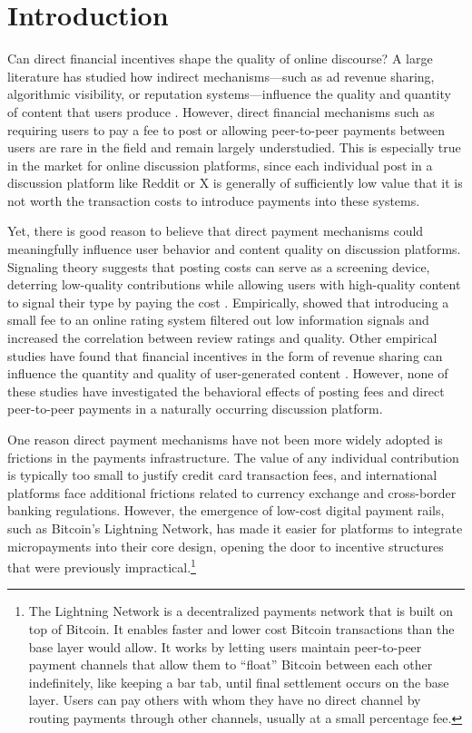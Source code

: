 \section{Introduction} \label{sec_intro}

Can direct financial incentives shape the quality of online discourse?  A large literature has studied how indirect mechanisms---such as ad revenue sharing, algorithmic visibility, or reputation systems---influence the quality and quantity of content that users produce \citep{krautresnick, luca2015socialmedia, aridor2024}. However, direct financial mechanisms such as requiring users to pay a fee to post or allowing peer-to-peer payments between users are rare in the field and remain largely understudied. This is especially true in the market for online discussion platforms, since each individual post in a discussion platform like Reddit or X is generally of sufficiently low value that it is not worth the transaction costs to introduce payments into these systems. 

Yet, there is good reason to believe that direct payment mechanisms could meaningfully influence user behavior and content quality on discussion platforms. Signaling theory suggests that posting costs can serve as a screening device, deterring low-quality contributions while allowing users with high-quality content to signal their type by paying the cost \citep{joseph2008email}. Empirically, \citet{tchernichovski2019pnas} showed that introducing a small fee to an online rating system filtered out low information signals and increased the correlation between review ratings and quality. Other empirical studies have found that financial incentives in the form of revenue sharing can influence the quantity and quality of user-generated content  \citep{sun2013blogs, elkomboz2023youtube, kerkhof2024youtube}. However, none of these studies have investigated the behavioral effects of posting fees and direct peer-to-peer payments in a naturally occurring discussion platform. 

One reason direct payment mechanisms have not been more widely adopted is frictions in the payments infrastructure. The value of any individual contribution is typically too small to justify credit card transaction fees, and international platforms face additional frictions related to currency exchange and cross-border banking regulations. However, the emergence of low-cost digital payment rails, such as Bitcoin's Lightning Network, has made it easier for platforms to integrate micropayments into their core design, opening the door to incentive structures that were previously impractical.\footnote{The Lightning Network is a decentralized payments network that is built on top of Bitcoin. It enables faster and lower cost Bitcoin transactions than the base layer would allow. It works by letting users maintain peer-to-peer payment channels that allow them to ``float'' Bitcoin between each other indefinitely, like keeping a bar tab, until final settlement occurs on the base layer. Users can pay others with whom they have no direct channel by routing payments through other channels, usually at a small percentage fee.}

